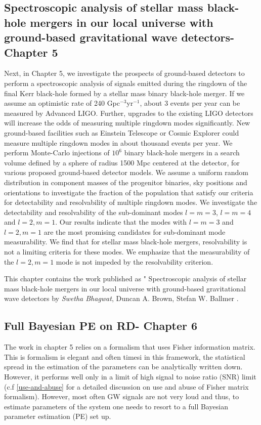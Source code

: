 \subsection{Spectroscopic analysis of stellar mass black-hole mergers in our local universe with ground-based gravitational wave detectors- Chapter 5}
Next, in Chapter 5, we investigate the prospects of ground-based detectors to perform a spectroscopic analysis of signals emitted during the ringdown of the final Kerr black-hole formed by a stellar mass binary black-hole merger. If we assume an optimistic rate of 240 Gpc$^{-3}$yr$^{-1}$, about 3 events per year can be measured by Advanced LIGO. Further, upgrades to the existing LIGO detectors will increase the odds of measuring multiple ringdown modes significantly. New ground-based facilities such as Einstein Telescope or Cosmic Explorer could measure multiple ringdown modes in about thousand events per year. We perform Monte-Carlo injections of $10^{6}$ binary black-hole mergers in a search volume defined by a sphere of radius 1500 Mpc centered at the detector, for various proposed ground-based detector models. We assume a uniform random distribution in component masses of the progenitor binaries, sky positions and orientations to investigate the fraction of the population that satisfy our criteria for detectability and resolvability of multiple ringdown modes. We investigate the detectability and resolvability of the sub-dominant modes $l=m=3$, $l=m=4$ and $l=2, m=1$. Our results indicate that the modes with $l=m=3$ and $l=2, m=1$ are the most promising candidates for sub-dominant mode measurability. We find that for stellar mass black-hole mergers, resolvability is not a limiting criteria for these modes. We emphasize that the measurability of the $l=2, m=1$ mode is not impeded by the resolvability criterion.

This chapter contains the work published as "
Spectroscopic analysis of stellar mass black-hole mergers in our local universe with ground-based gravitational wave detectors
by \textit{Swetha Bhagwat}, Duncan A. Brown, Stefan W. Ballmer \cite{MySpectroscopy}.

\subsection{Full Bayesian PE on RD- Chapter 6}
The work in chapter 5 relies on a formalism that uses Fisher information matrix. This is formalism is elegant and often timesi in this framework, the statistical spread in the estimation of the parameters can be analytically written down. However, it performs well only in a limit of high signal to noise ratio (SNR) limit (c.f \ref{use-and-abuse} for a detailed discussion on use and abuse of Fisher matrix formalism). However, most often GW signals are not very loud and thus, to estimate parameters of the system one needs to resort to a full Bayesian parameter estimation (PE) set up. 

